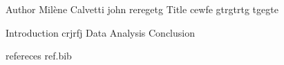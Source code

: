 Author Milène Calvetti john reregetg
Title cewfe gtrgtrtg tgegte

Introduction crjrfj  
Data 
Analysis
Conclusion

refereces 
ref.bib

